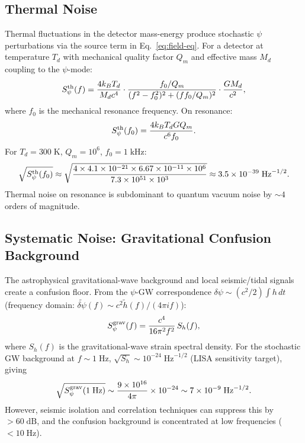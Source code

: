 \documentclass[twocolumn,superscriptaddress,prd,nofootinbib]{revtex4-2}
\begin{document}
\subsection{Thermal Noise}

Thermal fluctuations in the detector mass-energy produce stochastic
$\psi$ perturbations via the source term in Eq.~\eqref{eq:field-eq}.
For a detector at temperature $T_d$ with mechanical quality factor $Q_m$
and effective mass $M_d$ coupling to the $\psi$-mode:
\begin{equation}
S_\psi^{\rm th}(f) = \frac{4k_B T_d}{M_d c^4}
\cdot \frac{f_0/Q_m}{(f^2 - f_0^2)^2 + (f f_0/Q_m)^2}
\cdot \frac{G M_d}{c^2},
\label{eq:thermal-noise-full}
\end{equation}
where $f_0$ is the mechanical resonance frequency. On resonance:
\begin{equation}
S_\psi^{\rm th}(f_0) = \frac{4 k_B T_d G Q_m}{c^6 f_0}.
\label{eq:thermal-on-resonance}
\end{equation}
For $T_d = 300\;\text{K}$, $Q_m = 10^6$, $f_0 = 1\;\text{kHz}$:
\begin{equation}
\sqrt{S_\psi^{\rm th}(f_0)} \approx
\sqrt{\frac{4\times 4.1\times 10^{-21}\times 6.67\times 10^{-11}\times 10^6}
{7.3\times 10^{51}\times 10^3}}
\approx 3.5\times 10^{-39}\;\text{Hz}^{-1/2}.
\end{equation}
Thermal noise on resonance is subdominant to quantum vacuum noise by
$\sim 4$ orders of magnitude.

\subsection{Systematic Noise: Gravitational Confusion Background}

The astrophysical gravitational-wave background and local seismic/tidal
signals create a confusion floor. From the $\psi$-GW correspondence
$\delta\psi \sim (c^2/2)\int h\,dt$ (frequency domain:
$\tilde{\delta\psi}(f) \sim c^2 \tilde{h}(f)/(4\pi i f)$):
\begin{equation}
S_\psi^{\rm grav}(f) = \frac{c^4}{16\pi^2 f^2}\,S_h(f),
\label{eq:grav-confusion}
\end{equation}
where $S_h(f)$ is the gravitational-wave strain spectral density.
For the stochastic GW background at $f \sim 1\;\text{Hz}$,
$\sqrt{S_h} \sim 10^{-24}\;\text{Hz}^{-1/2}$
(LISA sensitivity target), giving
\begin{equation}
\sqrt{S_\psi^{\rm grav}(1\;\text{Hz})} \sim
\frac{9\times 10^{16}}{4\pi}\times 10^{-24}
\sim 7\times 10^{-9}\;\text{Hz}^{-1/2}.
\end{equation}
However, seismic isolation and correlation techniques can suppress this
by $>60\;\text{dB}$, and the confusion background is concentrated at
low frequencies ($<10\;\text{Hz}$).
\end{document}

